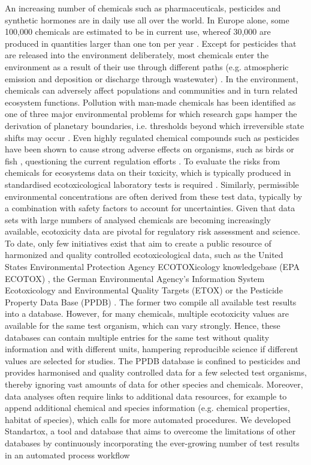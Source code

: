 \documentclass[10pt, a4paper, english]{article}
\begin{document}
An increasing number of chemicals such as pharmaceuticals, pesticides and synthetic hormones are in daily use all over the world. In Europe alone, some 100,000 chemicals are estimated to be in current use, whereof 30,000 are produced in quantities larger than one ton per year \citep{breithaupt_costs_2006}. Except for pesticides that are released into the environment deliberately, most chemicals enter the environment as a result of their use through different paths (e.g. atmospheric emission and deposition or discharge through wastewater) \citep{schwarzenbach_challenge_2006}. In the environment, chemicals can adversely affect populations and communities and in turn related ecosystem functions. Pollution with man-made chemicals has been identified as one of three major environmental problems for which research gaps hamper the derivation of planetary boundaries, i.e. thresholds beyond which irreversible state shifts may occur \citep{steffen_planetary_2015}. Even highly regulated chemical compounds such as pesticides have been shown to cause strong adverse effects on organisms, such as birds \citep{hallmann_declines_2014} or fish \citep{yamamuro_neonicotinoids_2019}, questioning the current regulation efforts \citep{schafer_future_2019}. To evaluate the risks from chemicals for ecosystems data on their toxicity, which is typically produced in standardised ecotoxicological laboratory tests is required \citep{malaj_organic_2014, morrissey_neonicotinoid_2015}. Similarly, permissible environmental concentrations are often derived from these test data, typically by a combination with safety factors to account for uncertainties. Given that data sets with large numbers of analysed chemicals are becoming increasingly available, ecotoxicity data are pivotal for regulatory risk assessment and science. To date, only few initiatives exist that aim to create a public resource of harmonized and quality controlled ecotoxicological data, such as the United States Environmental Protection Agency ECOTOXicology knowledgebase (EPA ECOTOX) \citep{elonen_ecotoxicology_2018}, the German Environmental Agency's Information System Ecotoxicology and Environmental Quality Targets (ETOX) \citep{umweltbundesamt_etox_2019} or the Pesticide Property Data Base (PPDB) \citep{lewis_international_2016}. The former two compile all available test results into a database. However, for many chemicals, multiple ecotoxicity values are available for the same test organism, which can vary strongly. Hence, these databases can contain multiple entries for the same test without quality information and with different units, hampering reproducible science if different values are selected for studies. The PPDB database is confined to pesticides and provides harmonised and quality controlled data for a few selected test organisms, thereby ignoring vast amounts of data for other species and chemicals. Moreover, data analyses often require links to additional data resources, for example to append additional chemical and species information (e.g. chemical properties, habitat of species), which calls for more automated procedures. We developed Standartox, a tool and database that aims to overcome the limitations of other databases by continuously incorporating the ever-growing number of test results in an automated process workflow 
\end{document}
